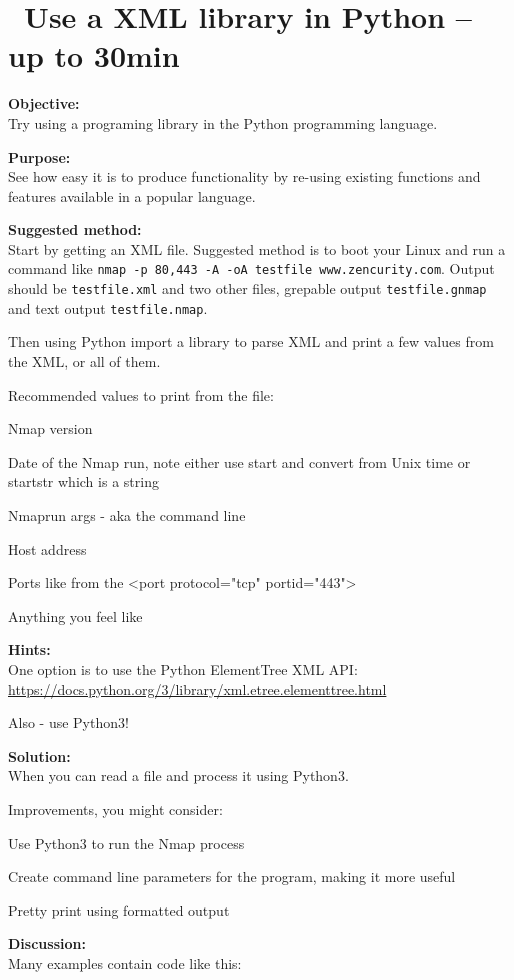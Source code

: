 \documentclass[a4paper,11pt,notitlepage]{report}
\begin{document}
\chapter{\faInfoCircle\ Use a XML library in Python -- up to 30min}
\label{ex-python-library}

{\bf Objective:}\\
Try using a programing library in the Python programming language.

{\bf Purpose:}\\
See how easy it is to produce functionality by re-using existing functions and features available in a popular language.

{\bf Suggested method:}\\
Start by getting an XML file. Suggested method is to boot your Linux and run a command like \verb+nmap -p 80,443 -A -oA testfile www.zencurity.com+. Output should be \verb+testfile.xml+ and two other files, grepable output \verb+testfile.gnmap+ and text output \verb+testfile.nmap+.

Then using Python import a library to parse XML and print a few values from the XML, or all of them.

Recommended values to print from the file:
\begin{list2}
\item Nmap version
\item Date of the Nmap run, note either use start and convert from Unix time or startstr which is a string
\item Nmaprun args - aka the command line
\item Host address
\item Ports like from the <port protocol="tcp" portid="443">
\item Anything you feel like
\end{list2}

{\bf Hints:}\\
One option is to use the Python ElementTree XML API:\\
\url{https://docs.python.org/3/library/xml.etree.elementtree.html}

Also - use Python3!

{\bf Solution:}\\
When you can read a file and process it using Python3.

Improvements, you might consider:
\begin{list2}
\item Use Python3 to run the Nmap process
\item Create command line parameters for the program, making it more useful
\item Pretty print using formatted output
\end{list2}
{\bf Discussion:}\\
Many examples contain code like this:
\end{document}
